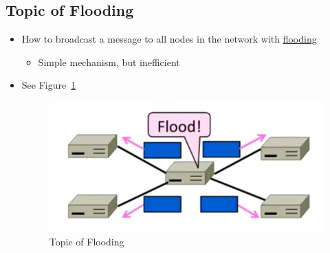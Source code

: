 \documentclass[12pt]{ctexart}   %
\begin{document}
	\subsection{Topic of Flooding}
	\begin{itemize}
		\item How to broadcast a message to all nodes in the network with \underline{flooding}
		\begin{itemize}
			\item Simple mechanism, but inefficient
		\end{itemize}
		\item See Figure~\ref{fig:5-5-1}
			
		\begin{figure}[h!] %
		\centering
		 \includegraphics[scale=0.7]{images/5-5-1}
		\caption{ Topic of Flooding }
		 \label{fig:5-5-1}
		 \end{figure}
	\end{itemize}
	
\end{document}
